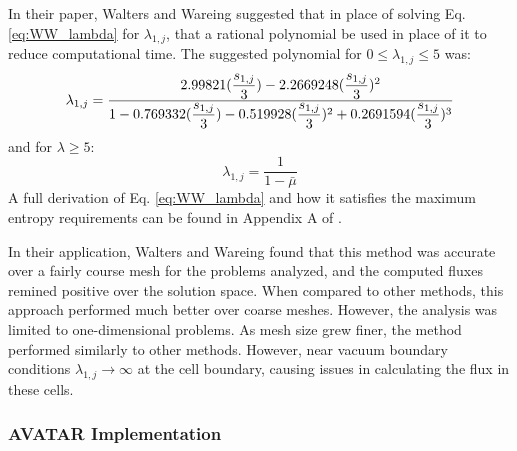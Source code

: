 In their paper, Walters and Wareing \cite{walters_accurate_1996} suggested that in place of
solving Eq. \eqref{eq:WW_lambda} for $\lambda_{1,j}$, that a rational polynomial
be used in place of it to reduce computational time. The
suggested polynomial for $0 \leq \lambda_{1,j} \leq 5$ was:
\newcommand{\lamvar}{\dfrac{s_{1,j}}{3}}
\begin{equation}
  \lambda_{1,j} =  \dfrac{2.99821 (\lamvar) - 2.2669248 (\lamvar)^2 }{1 - 0.769332
             (\lamvar) -0.519928 (\lamvar)^2 + 0.2691594 (\lamvar)^3} \\
\end{equation}
and for $\lambda \geq 5$:
\begin{equation}
  \lambda_{1,j} = \frac{1}{1-\bar\mu}
\end{equation}
A full derivation of Eq. \eqref{eq:WW_lambda} and how it satisfies the maximum
entropy requirements can be found in Appendix A of \cite{walters_accurate_1996}.

In their application, Walters and Wareing found that this method was accurate
over a fairly course mesh for the problems analyzed, and the computed fluxes
remined positive over the solution space. When compared to other methods, this
approach performed much better over coarse meshes. However, the analysis was
limited to one-dimensional problems. As mesh size grew finer, the method
performed similarly to other methods. However, near vacuum boundary conditions
$\lambda_{1,j} \rightarrow \infty$ at the cell boundary, causing issues in
calculating the flux in these cells.

\subsubsection*{AVATAR Implementation}

